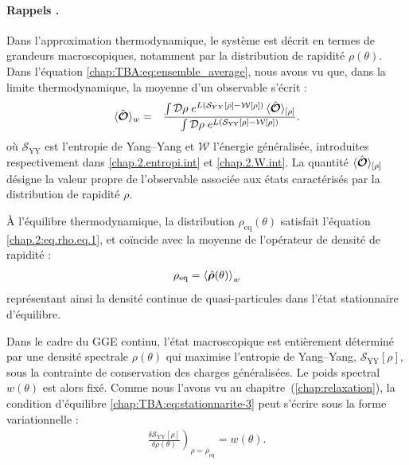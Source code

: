\begin{mdframed}[
	linewidth=0.5pt, 
	backgroundcolor=gray!5, 
	roundcorner=50pt,	
	innerleftmargin=5pt,
    innerrightmargin=5pt,
    innertopmargin=-10pt,
    innerbottommargin=2pt,
    leftmargin=2pt,
    rightmargin=2pt
	]
\paragraph{Rappels .}

Dans l’approximation thermodynamique, le système est décrit en termes de grandeurs macroscopiques, notamment par la distribution de rapidité $\rho(\theta)$.  
Dans l’équation \eqref{chap:TBA:eq:ensemble_average}, nous avons vu que, dans la limite thermodynamique, la moyenne d’un observable s’écrit :
\begin{eqnarray}
	\langle \hat{\bm{\mathcal{O}}} \rangle_{w} & = & \frac{\int \mathcal{D} \rho \; e^{L (\mathcal{S}_{YY}[\rho] - \mathcal{W}[\rho])} \, \langle\hat{\bm{\mathcal{O}}}\rangle_{[\rho]}}{\int \mathcal{D} \rho \; e^{L (\mathcal{S}_{\mathrm{YY}}[\rho] - \mathcal{W}[\rho])}}. \label{chap:Fluc:eq:ensemble_average}
\end{eqnarray}
où $\mathcal{S}_{\mathrm{YY}}$ est l’entropie de Yang–Yang et $\mathcal{W}$ l’énergie généralisée, introduites respectivement dans \eqref{chap.2.entropi.int} et \eqref{chap.2.W.int}.  
La quantité $\langle\hat{\bm{\mathcal{O}}}\rangle_{[\rho]}$ désigne la valeur propre de l’observable associée aux états caractérisés par la distribution de rapidité $\rho$.

\medskip

À l’équilibre thermodynamique, la distribution $\rho_{\mathrm{eq}}(\theta)$ satisfait l’équation \eqref{chap.2:eq.rho.eq.1}, et coïncide avec la moyenne de l’opérateur de densité de rapidité :
\begin{eqnarray}
	 \rho_{\mathrm{eq}} =  \braket{ \hat{\bm{\rho}}(\theta) }_w	
\end{eqnarray}
représentant ainsi la densité continue de quasi-particules dans l’état stationnaire d’équilibre.

\medskip

Dans le cadre du GGE continu, l’état macroscopique est entièrement déterminé par une densité spectrale $\rho(\theta)$ qui maximise l’entropie de Yang–Yang, $\mathcal{S}_{\mathrm{YY}}[\rho]$, sous la contrainte de conservation des charges généralisées. Le poids spectral $w(\theta)$ est alors fixé.  
Comme nous l’avons vu au chapitre~(\ref{chap:relaxation}), la condition d’équilibre \eqref{chap:TBA:eq:stationnarite-3} peut s’écrire sous la forme variationnelle :
\begin{eqnarray}
	\left. \frac{\delta \mathcal{S}_{\mathrm{YY}}[\rho]}{\delta \rho(\theta)} \right)_{\rho = \rho_{\mathrm{eq}}} = w(\theta). \label{chap:TBA:eq:stationnarite-3}
\end{eqnarray}

\end{mdframed}

